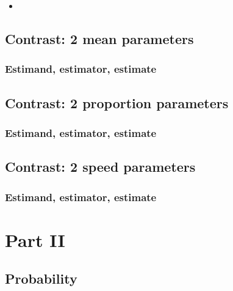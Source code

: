 \documentclass[]{book}
\begin{document}
\begin{itemize}
\item
\end{itemize}

\hypertarget{contrast2Muparas}{%
\chapter{Contrast: 2 mean parameters}\label{contrast2Muparas}}

\hypertarget{estimand-estimator-estimate}{%
\section{Estimand, estimator, estimate}\label{estimand-estimator-estimate}}

\hypertarget{contrast2Piparas}{%
\chapter{Contrast: 2 proportion parameters}\label{contrast2Piparas}}

\hypertarget{estimand-estimator-estimate-1}{%
\section{Estimand, estimator, estimate}\label{estimand-estimator-estimate-1}}

\hypertarget{contrast2Lambdaparas}{%
\chapter{Contrast: 2 speed parameters}\label{contrast2Lambdaparas}}

\hypertarget{estimand-estimator-estimate-2}{%
\section{Estimand, estimator, estimate}\label{estimand-estimator-estimate-2}}

\hypertarget{part-part-ii}{%
\part{Part II}\label{part-part-ii}}

\hypertarget{probability}{%
\chapter{Probability}\label{probability}}
\end{document}

